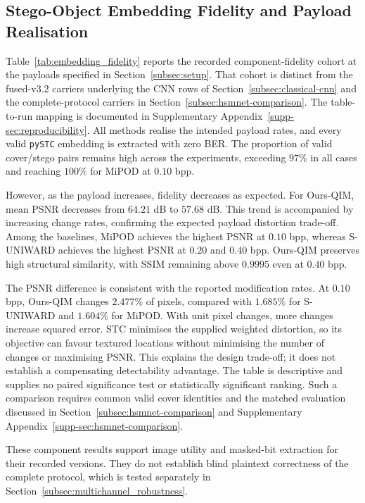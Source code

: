 \documentclass[pdflatex,sn-mathphys-num]{sn-jnl}%
\theoremstyle{definition}
\theoremstyle{game}
\theoremstyle{thmstyleone}%
\theoremstyle{thmstyletwo}%
\theoremstyle{thmstylethree}%
\begin{document}
\subsection{Stego-Object Embedding Fidelity and Payload Realisation}
\label{subsec:embedding_fidelity}
Table~\ref{tab:embedding_fidelity} reports the recorded component-fidelity
cohort at the payloads specified in Section~\ref{subsec:setup}. That cohort
is distinct from the fused-v3.2 carriers underlying the CNN rows of
Section~\ref{subsec:classical-cnn} and the complete-protocol carriers in
Section~\ref{subsec:hsmnet-comparison}. The table-to-run mapping is
documented in Supplementary Appendix~\ref{supp-sec:reproducibility}. All methods realise the intended payload rates, and every valid \texttt{pySTC} embedding is extracted with zero BER. The proportion of valid cover/stego pairs remains high across the experiments, exceeding $97\%$ in all cases and reaching $100\%$ for MiPOD at $0.10$ bpp.

However, as the payload increases, fidelity decreases as expected. For Ours-QIM, mean PSNR decreases from $64.21$ dB to $57.68$ dB. This trend is accompanied by increasing change rates, confirming the expected payload distortion trade-off. Among the baselines, MiPOD achieves the highest PSNR at $0.10$ bpp, whereas S-UNIWARD achieves the highest PSNR at $0.20$ and $0.40$ bpp. Ours-QIM preserves high structural similarity, with SSIM remaining above $0.9995$ even at $0.40$ bpp.

The PSNR difference is consistent with the reported modification rates.
At $0.10$ bpp, Ours-QIM changes $2.477\%$ of pixels, compared with
$1.685\%$ for S-UNIWARD and $1.604\%$ for MiPOD. With unit pixel changes,
more changes increase squared error. STC minimises the supplied weighted
distortion, so its objective can favour textured locations without
minimising the number of changes or maximising PSNR. This explains the
design trade-off; it does not establish a compensating detectability
advantage. The table is descriptive and supplies no paired significance
test or statistically significant ranking. Such a comparison requires
common valid cover identities and the matched evaluation discussed in
Section~\ref{subsec:hsmnet-comparison} and Supplementary
Appendix~\ref{supp-sec:hsmnet-comparison}.

These component results support image utility and masked-bit
extraction for their recorded versions. They do not establish blind plaintext
correctness of the complete protocol, which is tested separately in
Section~\ref{subsec:multichannel_robustness}. %
\end{document}
